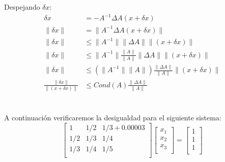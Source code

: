 Despejando $\delta x$:
\begin{align}
    \delta x &= -A^{-1} \Delta A(x+\delta x) \nonumber \\
    \| \delta x \| &=\| A^{-1} \Delta A(x+\delta x) \| \nonumber \\
    \| \delta x \| &\leq \| A^{-1} \| \| \Delta A\| \|(x+\delta x) \| \nonumber \\
    \| \delta x \| &\leq \| A^{-1} \| \frac{\| A\|}{\| A\|}\| \Delta A\| \|(x+\delta x) \| \nonumber \\
    \| \delta x \| &\leq (\| A^{-1} \| \| A\|)\frac{\| \Delta A\|}{\| A\|} \|(x+\delta x) \| \nonumber \\
    \frac{\| \delta x \|}{\|(x+\delta x) \|} &\leq Cond(A)\frac{\| \Delta A\|}{\| A\|}  
\end{align}\\\\
A continuación verificaremos la desigualdad para el siguiente sistema:
$$\begin{bmatrix}
       1 & 1/2 & 1/3 + 0.00003\\
       1/2 & 1/3 & 1/4 \\
       1/3 & 1/4 & 1/5 \\
    \end{bmatrix}
     \begin{bmatrix}
       x_1 \\
       x_2 \\
       x_3 \\
    \end{bmatrix}=
    \begin{bmatrix}
       1 \\
       1 \\
       1 \\
    \end{bmatrix}
    $$
    
